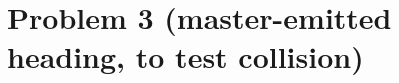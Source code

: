 \documentclass[11pt]{article}
\begin{document}
\section*{Problem 3 (master-emitted heading, to test collision)}

\end{document}
